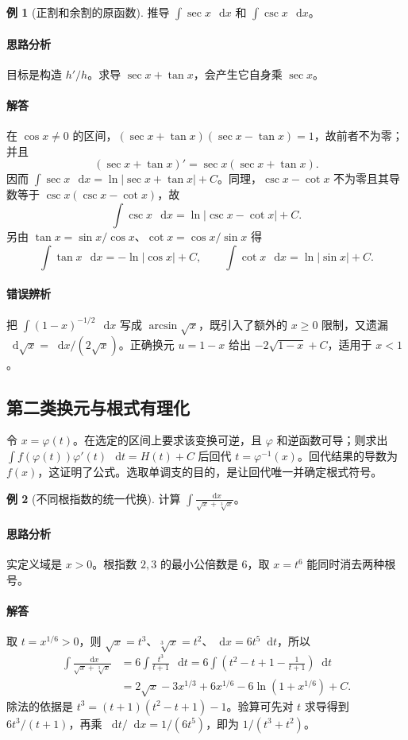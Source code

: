 \documentclass[UTF8,fontset=fandol,12pt,oneside,openany]{ctexrep}
\newcommand{\dd}{\mathop{}\!\mathrm d}
\theoremstyle{definition}
\newtheorem{example}{例}[chapter]
\begin{document}
\begin{example}[正割和余割的原函数]
推导 $\int\sec x\,\dd x$ 和 $\int\csc x\,\dd x$。
\end{example}
\paragraph{思路分析}目标是构造 $h'/h$。求导 $\sec x+\tan x$，会产生它自身乘 $\sec x$。
\paragraph{解答}在 $\cos x\ne0$ 的区间，$(\sec x+\tan x)(\sec x-\tan x)=1$，故前者不为零；并且
\[
(\sec x+\tan x)'=\sec x(\sec x+\tan x).
\]
因而 $\int\sec x\,\dd x=\ln|\sec x+\tan x|+C$。同理，$\csc x-\cot x$ 不为零且其导数等于 $\csc x(\csc x-\cot x)$，故
\[
\int\csc x\,\dd x=\ln|\csc x-\cot x|+C.
\]
另由 $\tan x=\sin x/\cos x$、$\cot x=\cos x/\sin x$ 得
\[
\int\tan x\,\dd x=-\ln|\cos x|+C,
\qquad\int\cot x\,\dd x=\ln|\sin x|+C.
\]

\paragraph{错误辨析}把 $\int(1-x)^{-1/2}\,\dd x$ 写成 $\arcsin\sqrt{x}$，既引入了额外的 $x\ge0$ 限制，又遗漏 $\dd\sqrt{x}=\dd x/(2\sqrt{x})$。正确换元 $u=1-x$ 给出 $-2\sqrt{1-x}+C$，适用于 $x<1$。

\subsection{第二类换元与根式有理化}
令 $x=\varphi(t)$。在选定的区间上要求该变换可逆，且 $\varphi$ 和逆函数可导；则求出 $\int f(\varphi(t))\varphi'(t)\,\dd t=H(t)+C$ 后回代 $t=\varphi^{-1}(x)$。回代结果的导数为 $f(x)$，这证明了公式。选取单调支的目的，是让回代唯一并确定根式符号。

\begin{example}[不同根指数的统一代换]
计算 $\displaystyle\int\frac{\dd x}{\sqrt{x}+\sqrt[3]{x}}$。
\end{example}
\paragraph{思路分析}实定义域是 $x>0$。根指数 $2,3$ 的最小公倍数是 $6$，取 $x=t^6$ 能同时消去两种根号。
\paragraph{解答}取 $t=x^{1/6}>0$，则 $\sqrt{x}=t^3$、$\sqrt[3]{x}=t^2$、$\dd x=6t^5\dd t$，所以
\begin{align*}
\int\frac{\dd x}{\sqrt{x}+\sqrt[3]{x}}
&=6\int\frac{t^3}{t+1}\,\dd t
=6\int\left(t^2-t+1-\frac1{t+1}\right)\dd t\\
&=2\sqrt{x}-3x^{1/3}+6x^{1/6}
-6\ln(1+x^{1/6})+C.
\end{align*}
除法的依据是 $t^3=(t+1)(t^2-t+1)-1$。验算可先对 $t$ 求导得到 $6t^3/(t+1)$，再乘 $\dd t/\dd x=1/(6t^5)$，即为 $1/(t^3+t^2)$。
\end{document}

